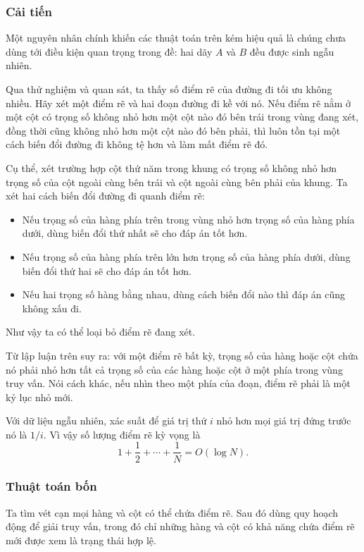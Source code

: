 \documentclass[11pt]{article}
\begin{document}
\subsubsection{Cải tiến}

Một nguyên nhân chính khiến các thuật toán trên kém hiệu quả là chúng chưa
dùng tới điều kiện quan trọng trong đề: hai dãy \(A\) và \(B\) đều được sinh
ngẫu nhiên.

Qua thử nghiệm và quan sát, ta thấy số điểm rẽ của đường đi tối ưu không
nhiều. Hãy xét một điểm rẽ và hai đoạn đường đi kề với nó. Nếu điểm rẽ nằm ở
một cột có trọng số không nhỏ hơn một cột nào đó bên trái trong vùng đang
xét, đồng thời cũng không nhỏ hơn một cột nào đó bên phải, thì luôn tồn tại
một cách biến đổi đường đi không tệ hơn và làm mất điểm rẽ đó.

Cụ thể, xét trường hợp cột thứ năm trong khung có trọng số không nhỏ hơn trọng
số của cột ngoài cùng bên trái và cột ngoài cùng bên phải của khung. Ta xét hai
cách biến đổi đường đi quanh điểm rẽ:
\begin{itemize}
  \item Nếu trọng số của hàng phía trên trong vùng nhỏ hơn trọng số của hàng
  phía dưới, dùng biến đổi thứ nhất sẽ cho đáp án tốt hơn.
  \item Nếu trọng số của hàng phía trên lớn hơn trọng số của hàng phía dưới,
  dùng biến đổi thứ hai sẽ cho đáp án tốt hơn.
  \item Nếu hai trọng số hàng bằng nhau, dùng cách biến đổi nào thì đáp án
  cũng không xấu đi.
\end{itemize}

Như vậy ta có thể loại bỏ điểm rẽ đang xét.

Từ lập luận trên suy ra: với một điểm rẽ bất kỳ, trọng số của hàng hoặc cột
chứa nó phải nhỏ hơn tất cả trọng số của các hàng hoặc cột ở một phía trong
vùng truy vấn. Nói cách khác, nếu nhìn theo một phía của đoạn, điểm rẽ phải
là một kỷ lục nhỏ mới.

Với dữ liệu ngẫu nhiên, xác suất để giá trị thứ \(i\) nhỏ hơn mọi giá trị
đứng trước nó là \(1/i\). Vì vậy số lượng điểm rẽ kỳ vọng là
\[
  1+\frac12+\cdots+\frac1N=O(\log N).
\]

\subsubsection{Thuật toán bốn}

Ta tìm vét cạn mọi hàng và cột có thể chứa điểm rẽ. Sau đó dùng quy hoạch
động để giải truy vấn, trong đó chỉ những hàng và cột có khả năng chứa điểm
rẽ mới được xem là trạng thái hợp lệ.
\end{document}
